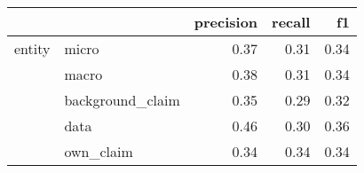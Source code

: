 \begin{tabular}{llrrr}
\toprule
       &           &  precision &  recall &   f1 \\
\midrule
entity & micro &       0.37 &    0.31 & 0.34 \\
       & macro &       0.38 &    0.31 & 0.34 \\
       & background\_claim &       0.35 &    0.29 & 0.32 \\
       & data &       0.46 &    0.30 & 0.36 \\
       & own\_claim &       0.34 &    0.34 & 0.34 \\
\bottomrule
\end{tabular}
